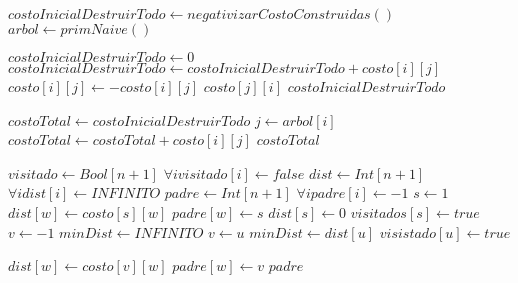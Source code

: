 \begin{algorithm}[H]
\begin{algorithmic}
	\State $costoInicialDestruirTodo \gets negativizarCostoConstruidas()$
	\State $arbol \gets primNaive()$
	\State \Return {}
\EndFunction

\end{algorithmic}
\end{algorithm}

\begin{algorithm}[H]
\begin{algorithmic}

	\State $costoInicialDestruirTodo \gets 0$
	\For{$i \in [0..n)$}
				\State $costoInicialDestruirTodo \gets costoInicialDestruirTodo + costo[i][j]$
				\State $costo[i][j] \gets -costo[i][j]$
				\State $costo[j][i]$
			\EndIf
		\EndFor
	\EndFor
	\State \Return $costoInicialDestruirTodo$
\EndFunction

\end{algorithmic}
\end{algorithm}


\begin{algorithm}[H]
\begin{algorithmic}

	\State $costoTotal \gets costoInicialDestruirTodo$
		\State $j \gets arbol[i]$
		\State $costoTotal \gets costoTotal + costo[i][j]$
	\EndFor
	\State \Return $costoTotal$
\EndFunction
\end{algorithmic}
\end{algorithm}


\begin{algorithm}[H]
\begin{algorithmic}
	\State $visitado \gets Bool[n+1]$
	\State $\forall i visitado[i] \gets false$
	\State $dist \gets Int[n+1]$
	\State $\forall i dist[i] \gets INFINITO$
	\State $padre \gets Int[n+1]$
	\State $\forall i padre[i] \gets -1$
	\State $s \gets 1$
			\State $dist[w] \gets costo[s][w]$
			\State $padre[w] \gets s$
		\EndIf
	\EndFor
	\State $dist[s] \gets 0$
	\State $visitados[s] \gets true$
		\State $v \gets -1$
		\State $minDist \gets INFINITO$
				\State $v \gets u$
				\State $minDist \gets dist[u]$
			\EndIf
		\EndFor
		\State $visistado[u] \gets true$

				\State $dist[w] \gets costo[v][w]$
				\State $padre[w] \gets v$
			\EndIf
		\EndFor
	\EndFor
	\State \Return $padre$
\EndFunction
\end{algorithmic}
\end{algorithm}

